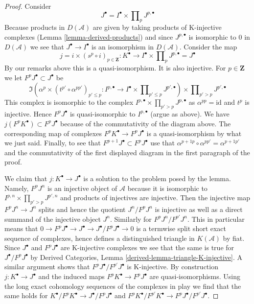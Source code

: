 \begin{proof}
\medskip\noindent
Consider
$$
J^\bullet = I^\bullet \times \prod\nolimits_p J^{p, \bullet}
$$
Because products in $D(\mathcal{A})$ are given by taking
products of K-injective complexes
(Lemma \ref{lemma-derived-products})
and since $J^{p, \bullet}$
is isomorphic to $0$ in $D(\mathcal{A})$ we see that
$J^\bullet \to I^\bullet$ is an isomorphism in $D(\mathcal{A})$.
Consider the map
$$
j = i \times (s^p \circ i)_{p \in \mathbf{Z}} :
K^\bullet
\longrightarrow
I^\bullet \times \prod\nolimits_p J^{p, \bullet} = J^\bullet
$$
By our remarks above this is a quasi-isomorphism. It is also injective.
For $p \in \mathbf{Z}$ we let $F^pJ^\bullet \subset J^\bullet$ be
$$
\Im\left(
\alpha^p \times (t^{p'} \circ \alpha^{pp'})_{p' \leq p} :
I^{p, \bullet}
\to
I^\bullet \times \prod\nolimits_{p' \leq p} J^{p', \bullet}
\right)
\times \prod\nolimits_{p' > p} J^{p', \bullet}
$$
This complex is isomorphic to the complex
$I^{p, \bullet} \times \prod_{p' > p} J^{p, \bullet}$
as $\alpha^{pp} = \text{id}$ and $t^p$ is injective.
Hence $F^pJ^\bullet$ is quasi-isomorphic to $I^{p, \bullet}$ (argue
as above). We have $j(F^pK^\bullet) \subset F^pJ^\bullet$ because
of the commutativity of the diagram above. The corresponding
map of complexes $F^pK^\bullet \to F^pJ^\bullet$ is a quasi-isomorphism
by what we just said. Finally, to see that
$F^{p + 1}J^\bullet \subset F^pJ^\bullet$
use that $\alpha^{p + 1p} \circ \alpha^{pp'} = \alpha^{p + 1p'}$
and the commutativity of the first displayed diagram
in the first paragraph of the proof.

\medskip\noindent
We claim that $j : K^\bullet \to J^\bullet$ is a solution to the
problem posed by the lemma. Namely, $F^pJ^n$ is an injective object
of $\mathcal{A}$ because it is isomorphic to
$I^{p, n} \times \prod_{p' > p} J^{p', n}$ and products of
injectives are injective. Then the injective map $F^pJ^n \to J^n$
splits and hence the quotient $J^n/F^pJ^n$ is injective as well
as a direct summand of the injective object $J^n$.
Similarly for $F^pJ^n/F^{p'}J^n$. This in particular means
that $0 \to F^pJ^\bullet \to J^\bullet \to J^\bullet/F^pJ^\bullet \to 0$
is a termwise split short exact sequence of complexes, hence defines
a distinguished triangle in $K(\mathcal{A})$ by fiat.
Since $J^\bullet$ and $F^pJ^\bullet$ are K-injective complexes
we see that the same is true for $J^\bullet/F^pJ^\bullet$
by Derived Categories, Lemma \ref{derived-lemma-triangle-K-injective}.
A similar argument shows that $F^pJ^\bullet/F^{p'}J^\bullet$
is K-injective. By construction $j : K^\bullet \to J^\bullet$
and the induced maps $F^pK^\bullet \to F^pJ^\bullet$ are
quasi-isomorphisms. Using the long exact cohomology sequences
of the complexes in play we find that the same holds for
$K^\bullet/F^pK^\bullet \to J^\bullet/F^pJ^\bullet$ and
$F^pK^\bullet/F^{p'}K^\bullet \to F^pJ^\bullet/F^{p'}J^\bullet$.
\end{proof}

